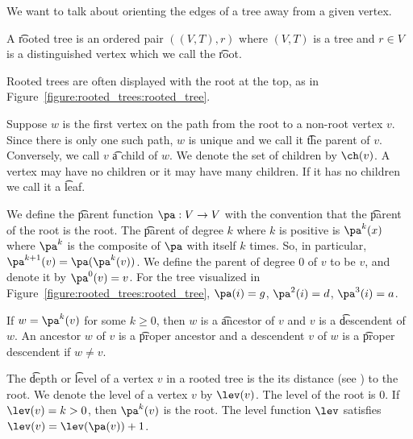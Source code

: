 

We want to talk about orienting the edges of a tree away from a given vertex.


A \t{rooted tree} is an ordered pair $((V, T), r)$ where $(V, T)$ is a tree and $r \in V$ is a distinguished vertex which we call the \t{root}.

Rooted trees are often displayed with the root at the top, as in Figure~\ref{figure:rooted_trees:rooted_tree}.


Suppose $w$ is the first vertex on the path from the root to a non-root vertex $v$.
Since there is only one such path, $w$ is unique and we call it \t{the parent} of $v$.
Conversely, we call $v$ \t{a child} of $w$.
We denote the set of children by $\ch(v)$.
A vertex may have no children or it may have many children.
If it has no children we call it a \t{leaf}.

We define the \t{parent function} $\pa: V \to V$ with the convention that the \t{parent of the root} is the root.
The \t{parent of degree $k$} where $k$ is positive is $\pa^k(x)$ where $\pa^k$ is the composite of $\pa$ with itself $k$ times.
So, in particular, $\pa^{k+1}(v) = \pa(\pa^k(v))$.
We define the parent of degree $0$ of $v$ to be $v$, and denote it by $\pa^0(v) = v$.
For the tree visualized in Figure~\ref{figure:rooted_trees:rooted_tree}, $\pa(i) = g$, $\pa^2(i) = d$, $\pa^3(i) = a$.

If $w = \pa^k(v)$ for some $k \geq 0$, then $w$ is a \t{ancestor} of $v$ and $v$ is a \t{descendent} of $w$.
An ancestor $w$ of $v$ is a \t{proper ancestor} and a descendent $v$ of $w$ is a \t{proper descendent} if $w \neq v$.

The \t{depth} or \t{level} of a vertex $v$ in a rooted tree is the its distance (see ) to the root.
We denote the level of a vertex $v$ by $\lev(v)$.
The level of the root is $0$.
If $\lev(v) = k > 0$, then $\pa^{k}(v)$ is the root.
The level function $\lev$ satisfies $\lev(v) = \lev(\pa(v)) + 1$.

%

